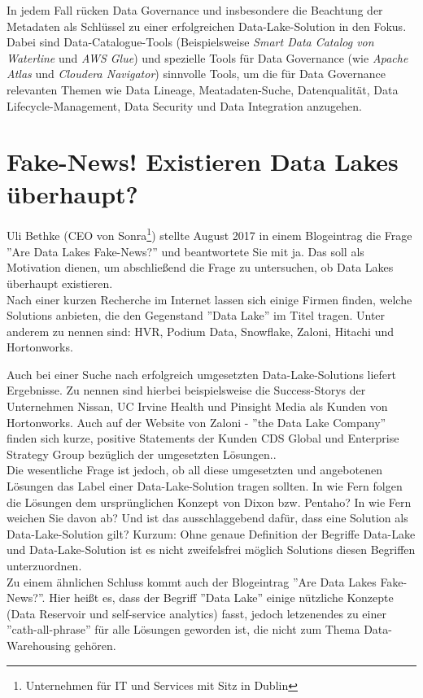 \documentclass[twoside,twocolumn]{article}
\begin{document}
In jedem Fall rücken Data Governance und insbesondere die Beachtung der Metadaten als Schlüssel zu einer erfolgreichen Data-Lake-Solution in den Fokus. Dabei sind Data-Catalogue-Tools (Beispielsweise \textit{Smart Data Catalog von Waterline} und \textit{AWS Glue}) und spezielle Tools für Data Governance (wie \textit{Apache Atlas} und \textit{Cloudera Navigator}) sinnvolle Tools, um die für Data Governance relevanten Themen wie Data Lineage, Meatadaten-Suche, Datenqualität, Data Lifecycle-Management, Data Security und Data Integration anzugehen.\cite{src8}

\section{Fake-News! Existieren Data Lakes überhaupt?}
Uli Bethke (CEO von Sonra\footnote{Unternehmen für IT und Services mit Sitz in Dublin}) stellte August 2017 in einem Blogeintrag\cite{src4} die Frage ''Are Data Lakes Fake-News?'' und beantwortete Sie mit ja. Das soll als Motivation dienen, um abschließend die Frage zu untersuchen, ob Data Lakes überhaupt existieren.\\

Nach einer kurzen Recherche im Internet lassen sich einige Firmen finden, welche Solutions anbieten, die den Gegenstand ''Data Lake'' im Titel tragen. Unter anderem zu nennen sind: HVR, Podium Data, Snowflake, Zaloni\cite{c1}, Hitachi\cite{c2} und Hortonworks\cite{c3}.

Auch bei einer Suche nach erfolgreich umgesetzten Data-Lake-Solutions liefert Ergebnisse. 
Zu nennen sind hierbei beispielsweise die Success-Storys der Unternehmen Nissan\cite{s1}, UC Irvine Health\cite{s2} und Pinsight Media\cite{s3} als Kunden von Hortonworks. Auch auf der Website von Zaloni - ''the Data Lake Company'' finden sich kurze, positive Statements der Kunden CDS Global und Enterprise Strategy Group bezüglich der umgesetzten Lösungen.\cite{s4}.\\

Die wesentliche Frage ist jedoch, ob all diese umgesetzten und angebotenen Lösungen das Label einer Data-Lake-Solution tragen sollten. In wie Fern folgen die Lösungen dem ursprünglichen Konzept von Dixon bzw. Pentaho? In wie Fern weichen Sie davon ab? Und ist das ausschlaggebend dafür, dass eine Solution als Data-Lake-Solution gilt? Kurzum: Ohne genaue Definition der Begriffe Data-Lake und Data-Lake-Solution ist es nicht zweifelsfrei möglich Solutions diesen Begriffen unterzuordnen.\\
Zu einem ähnlichen Schluss kommt auch der Blogeintrag ''Are Data Lakes Fake-News?''. Hier heißt es, dass der Begriff ''Data Lake'' einige nützliche Konzepte (Data Reservoir und self-service analytics) fasst, jedoch letzenendes zu einer ''cath-all-phrase'' für alle Lösungen geworden ist, die nicht zum Thema Data-Warehousing gehören.\cite{src4}\\
\end{document}
